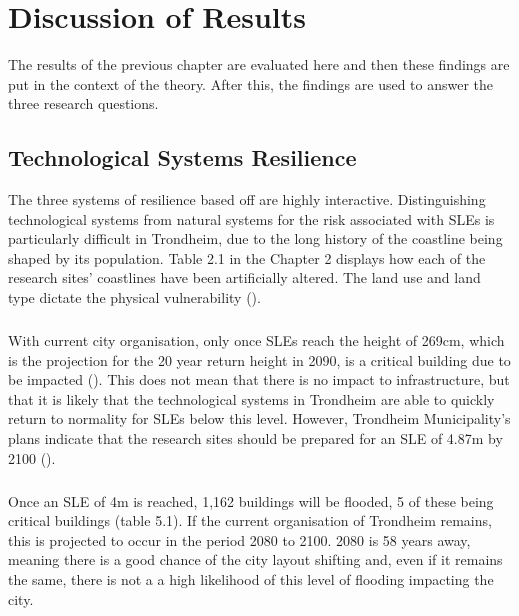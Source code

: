 

\chapter{Discussion of Results}
The results of the previous chapter are evaluated here and then these findings are put in the context of the theory. After this, the findings are used to answer the three research questions. 



\section{Technological Systems Resilience}
The three systems of resilience based off \cite{cutter_place-based_2008} are highly interactive. Distinguishing technological systems from natural systems for the risk associated with SLEs is particularly difficult in Trondheim, due to the long history of the coastline being shaped by its population. Table 2.1 in the Chapter 2 displays how each of the research sites' coastlines have been artificially altered. The land use and land type dictate the physical vulnerability (\cite{opach_seeking_2020}).
\paragraph{}

With current city organisation, only once SLEs reach the height of 269cm, which is the projection for the 20 year return height in 2090, is a critical building due to be impacted (\cite{kartverket_se_2020}). This does not mean that there is no impact to infrastructure, but that it is likely that the technological systems in Trondheim are able to quickly return to normality for SLEs below this level. However, Trondheim Municipality's plans indicate that the research sites should be prepared for an SLE  of 4.87m by 2100 (\cite{hanssen_saksframlegg_2013}).
\paragraph{}
Once an SLE of 4m is reached, 1,162 buildings will be flooded, 5 of these being critical buildings (table 5.1). If the current organisation of Trondheim remains, this is projected to occur in the period 2080 to 2100. 2080 is 58 years away, meaning there is a good chance of the city layout shifting and, even if it remains the same, there is not a a high likelihood of this level of flooding impacting the city.  
